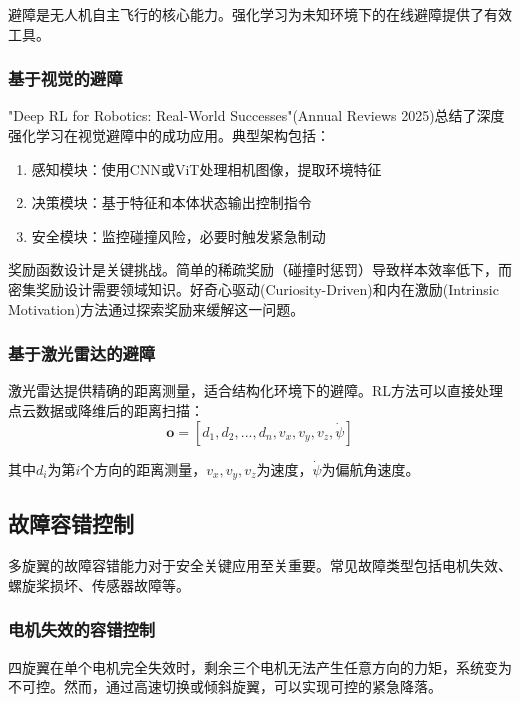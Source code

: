 \documentclass[12pt,a4paper]{ctexart}
\begin{document}
避障是无人机自主飞行的核心能力。强化学习为未知环境下的在线避障提供了有效工具。

\subsubsection{基于视觉的避障}

"Deep RL for Robotics: Real-World Successes"(Annual Reviews 2025)总结了深度强化学习在视觉避障中的成功应用。典型架构包括：

\begin{enumerate}
    \item 感知模块：使用CNN或ViT处理相机图像，提取环境特征
    \item 决策模块：基于特征和本体状态输出控制指令
    \item 安全模块：监控碰撞风险，必要时触发紧急制动
\end{enumerate}

奖励函数设计是关键挑战。简单的稀疏奖励（碰撞时惩罚）导致样本效率低下，而密集奖励设计需要领域知识。好奇心驱动(Curiosity-Driven)和内在激励(Intrinsic Motivation)方法通过探索奖励来缓解这一问题。

\subsubsection{基于激光雷达的避障}

激光雷达提供精确的距离测量，适合结构化环境下的避障。RL方法可以直接处理点云数据或降维后的距离扫描：
\begin{equation}
    \mathbf{o} = [d_1, d_2, ..., d_n, v_x, v_y, v_z, \dot{\psi}]
\end{equation}

其中$d_i$为第$i$个方向的距离测量，$v_x, v_y, v_z$为速度，$\dot{\psi}$为偏航角速度。

\subsection{故障容错控制}

多旋翼的故障容错能力对于安全关键应用至关重要。常见故障类型包括电机失效、螺旋桨损坏、传感器故障等。

\subsubsection{电机失效的容错控制}

四旋翼在单个电机完全失效时，剩余三个电机无法产生任意方向的力矩，系统变为不可控。然而，通过高速切换或倾斜旋翼，可以实现可控的紧急降落。
\end{document}
